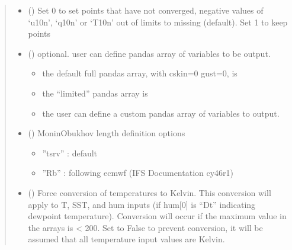 \documentclass[letterpaper,10pt,english]{sphinxmanual}
\begin{document}
\begin{fulllineitems}
\begin{quote}
\begin{description}
\begin{itemize}
\item {}
\sphinxAtStartPar
{} () \textendash{} Set 0 to set points that have not converged, negative values of ‘u10n’, ‘q10n’
or ‘T10n’ out of limits to missing (default). Set 1 to keep points

\item {}
\sphinxAtStartPar
{} () \textendash{}
\sphinxAtStartPar
optional. user can define pandas array of variables to be output.
\begin{itemize}
\item {}
\sphinxAtStartPar
the default full pandas array, with cskin=0 gust=0, is

\item {}
\sphinxAtStartPar
the “limited” pandas array is

\item {}
\sphinxAtStartPar
the user can define a custom pandas array of variables to output.

\end{itemize}


\item {}
\sphinxAtStartPar
{} () \textendash{}
\sphinxAtStartPar
Monin\sphinxhyphen{}Obukhov length definition options
\begin{itemize}
\item {}
\sphinxAtStartPar
”tsrv”  : default

\item {}
\sphinxAtStartPar
”Rb” : following ecmwf (IFS Documentation cy46r1)

\end{itemize}


\item {}
\sphinxAtStartPar
{} () \textendash{} Force conversion of temperatures to Kelvin. This conversion will
apply to T, SST, and hum inputs (if hum{[}0{]} is “Dt” indicating
dew\sphinxhyphen{}point temperature). Conversion will occur if the maximum value
in the arrays is \textless{} 200. Set to False to prevent conversion, it
will be assumed that all temperature input values are Kelvin.


\end{itemize}
\end{description}
\end{quote}
\end{fulllineitems}
\end{document}
